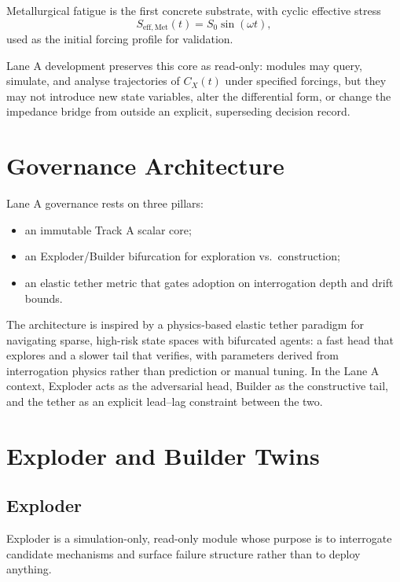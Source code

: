\documentclass[11pt]{article}
\begin{document}
Metallurgical fatigue is the first concrete substrate, with cyclic effective stress
\begin{equation}
S_{\mathrm{eff},\mathrm{Met}}(t) = S_0 \sin(\omega t),
\end{equation}
used as the initial forcing profile for validation.

Lane A development preserves this core as read-only: modules may query, simulate, and analyse trajectories of \(C_X(t)\) under specified forcings, but they may not introduce new state variables, alter the differential form, or change the impedance bridge from outside an explicit, superseding decision record.

\section{Governance Architecture}

Lane A governance rests on three pillars:
\begin{itemize}
  \item an immutable Track A scalar core;
  \item an Exploder/Builder bifurcation for exploration vs.\ construction;
  \item an elastic tether metric that gates adoption on interrogation depth and drift bounds.
\end{itemize}

The architecture is inspired by a physics-based elastic tether paradigm for navigating sparse, high-risk state spaces with bifurcated agents: a fast head that explores and a slower tail that verifies, with parameters derived from interrogation physics rather than prediction or manual tuning. In the Lane A context, Exploder acts as the adversarial head, Builder as the constructive tail, and the tether as an explicit lead--lag constraint between the two.

\section{Exploder and Builder Twins}

\subsection{Exploder}

Exploder is a simulation-only, read-only module whose purpose is to interrogate candidate mechanisms and surface failure structure rather than to deploy anything.
\end{document}
